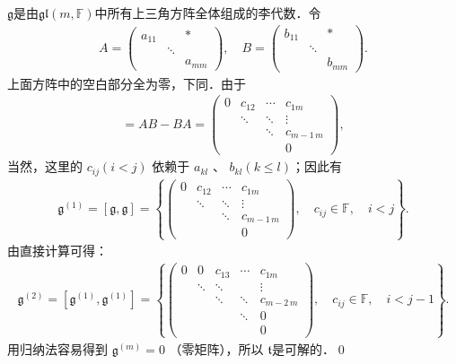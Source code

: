 $\mathfrak{g}$是由$\mathfrak{gl}(m,\mathbb{F})$中所有上三角方阵全体组成的李代数．令
\begin{align*}
A=\left(\begin{array}{lll}
    a_{11} & & * \\
    & \ddots & \\
    & & a_{m m}
\end{array}\right), \quad
B=\left(\begin{array}{lll}
    b_{11} & & * \\
    & \ddots & \\
    & & b_{mm}
\end{array}\right) .
\end{align*}
上面方阵中的空白部分全为零，下同．由于
\begin{align*}
[A, B]=A B-B A=\left(\begin{array}{cccc}
    0 & c_{12} & \cdots & c_{1 m} \\
    & \ddots & \ddots & \vdots \\
    & & \ddots & c_{m-1\, m} \\
    & & & 0
\end{array}\right),
\end{align*}
当然，这里的 $c_{i j}(i<j)$ 依赖于 $a_{kl}$ 、 $b_{kl}(k \leqslant l)$；因此有
\begin{align*}
\mathfrak{g}^{(1)}=[\mathfrak{g}, \mathfrak{g}]
=\left\{\left(\begin{array}{cccc}
    0 & c_{12} & \cdots & c_{1 m} \\
    & \ddots & \ddots & \vdots \\
    & & \ddots & c_{m-1\, m} \\
    & & & 0
\end{array}\right),
\quad c_{i j} \in \mathbb{F}, \quad i<j\right\} .
\end{align*}
由直接计算可得：
\begin{align*}
\mathfrak{g}^{(2)}=\left[\mathfrak{g}^{(1)}, \mathfrak{g}^{(1)}\right]
=\left\{\left(\begin{array}{ccccc}
    0 & 0 & c_{13} & \cdots & c_{1 m} \\
    & \ddots & \ddots & & \vdots \\
    & & \ddots & \ddots & c_{m-2\, m} \\
    & & & \ddots & 0 \\
    & & & & 0
\end{array}\right),
\quad c_{ij} \in \mathbb{F},\quad i<j-1\right\} .
\end{align*}
用归纳法容易得到 $\mathfrak{g}^{(m)}=0$ （零矩阵），所以 $\mathfrak{t}$是可解的．\qed

